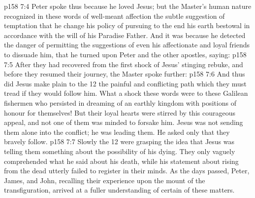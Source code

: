 \vs p158 7:4 Peter spoke thus because he loved Jesus; but the Master’s human nature recognized in these words of well\hyp{}meant affection the subtle suggestion of temptation that he change his policy of pursuing to the end his earth bestowal in accordance with the will of his Paradise Father. And it was because he detected the danger of permitting the suggestions of even his affectionate and loyal friends to dissuade him, that he turned upon Peter and the other apostles, saying: 
\vs p158 7:5 After they had recovered from the first shock of Jesus’ stinging rebuke, and before they resumed their journey, the Master spoke further: 
\vs p158 7:6 And thus did Jesus make plain to the 12 the painful and conflicting path which they must tread if they would follow him. What a shock these words were to these Galilean fishermen who persisted in dreaming of an earthly kingdom with positions of honour for themselves! But their loyal hearts were stirred by this courageous appeal, and not one of them was minded to forsake him. Jesus was not sending them alone into the conflict; he was leading them. He asked only that they bravely follow.
\vs p158 7:7 Slowly the 12 were grasping the idea that Jesus was telling them something about the possibility of his dying. They only vaguely comprehended what he said about his death, while his statement about rising from the dead utterly failed to register in their minds. As the days passed, Peter, James, and John, recalling their experience upon the mount of the transfiguration, arrived at a fuller understanding of certain of these matters.
